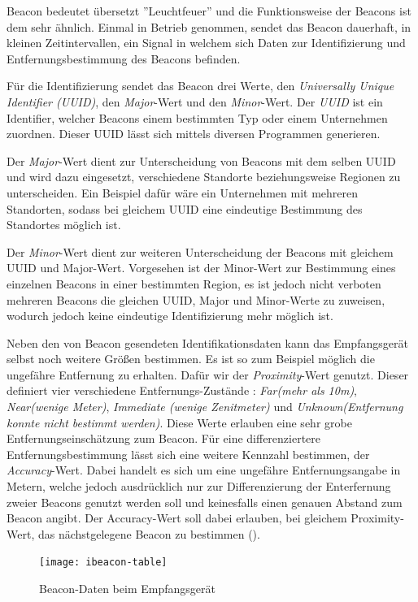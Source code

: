 Beacon bedeutet übersetzt ''Leuchtfeuer'' und die Funktionsweise der Beacons ist dem sehr ähnlich.
Einmal in Betrieb genommen, sendet das Beacon dauerhaft, in kleinen Zeitintervallen, ein Signal in welchem sich Daten zur Identifizierung und Entfernungsbestimmung des Beacons befinden.

Für die Identifizierung sendet das Beacon drei Werte, den \emph{Universally Unique Identifier (UUID)}, den \emph{Major}-Wert und den \emph{Minor}-Wert.
Der \emph{UUID} ist ein Identifier, welcher Beacons einem bestimmten Typ oder einem Unternehmen zuordnen. Dieser UUID lässt sich mittels diversen Programmen generieren.

Der \emph{Major}-Wert dient zur Unterscheidung von Beacons mit dem selben UUID und wird dazu eingesetzt, verschiedene Standorte beziehungsweise Regionen zu unterscheiden. Ein Beispiel dafür wäre ein Unternehmen mit mehreren Standorten, sodass bei gleichem UUID eine eindeutige Bestimmung des Standortes möglich ist.

Der \emph{Minor}-Wert dient zur weiteren Unterscheidung der Beacons mit gleichem UUID und Major-Wert. Vorgesehen ist der Minor-Wert zur Bestimmung eines einzelnen Beacons in einer bestimmten Region, es ist jedoch nicht verboten mehreren Beacons die gleichen UUID, Major und Minor-Werte zu zuweisen, wodurch jedoch keine eindeutige Identifizierung mehr möglich ist. 

Neben den von Beacon gesendeten Identifikationsdaten kann das Empfangsgerät selbst noch weitere Größen bestimmen. Es ist so zum Beispiel möglich die ungefähre Entfernung zu erhalten. 
Dafür wir der \emph{Proximity}-Wert genutzt. Dieser definiert vier verschiedene Entfernungs-Zustände : \textit{Far(mehr als 10m)}, \textit{Near(wenige Meter)}, \textit{Immediate (wenige Zenitmeter)} und \textit{Unknown(Entfernung konnte nicht bestimmt werden)}. 
Diese Werte erlauben eine sehr grobe Entfernungseinschätzung zum Beacon. 
Für eine differenziertere Entfernungsbestimmung lässt sich eine weitere Kennzahl bestimmen, der \textit{Accuracy}-Wert. Dabei handelt es sich um eine ungefähre Entfernungsangabe in Metern, welche jedoch ausdrücklich nur zur Differenzierung der Enterfernung zweier Beacons genutzt werden soll und keinesfalls einen genauen Abstand zum Beacon angibt. Der Accuracy-Wert soll dabei erlauben, bei gleichem Proximity-Wert, das nächstgelegene Beacon zu bestimmen (\citet{clbeaconref}).

\begin{figure}[htb!]
		\centering
	\texttt{[image: ibeacon-table]}
	\caption{Beacon-Daten beim Empfangsgerät}
	\label{ibeacon-table}
\end{figure}


